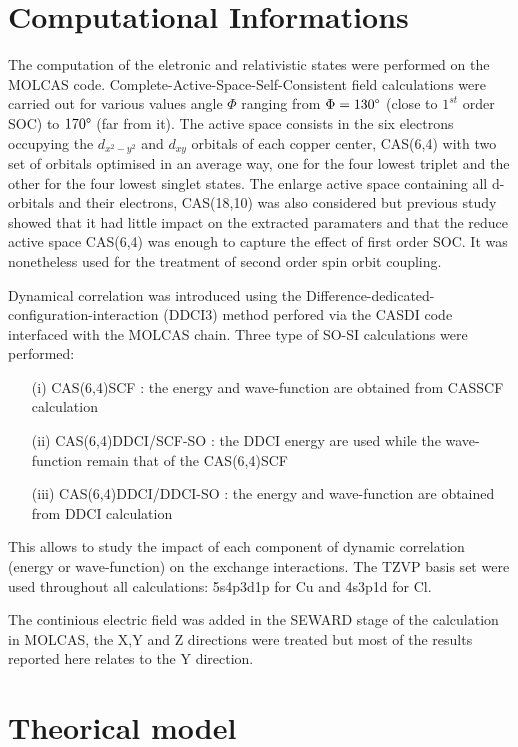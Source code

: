 \documentclass[10pt]{report}
\numberwithin{equation}{section}
\begin{document}
\section{Computational Informations}

The computation of the eletronic and relativistic states were performed on the MOLCAS code.
Complete-Active-Space-Self-Consistent field calculations were carried out for various values angle $\Phi$ ranging from $\Phi=130\degree$ (close to $1^{st}$ order SOC) to $170\degree$ (far from it).
The active space consists in the six electrons occupying the $d_{x^2-y^2}$ and $d_{xy}$ orbitals of each copper center, CAS(6,4) with two set of orbitals optimised in an average way, one for the four lowest triplet and the other for the four lowest singlet states.
The enlarge active space containing all d-orbitals and their electrons, CAS(18,10) was also considered but previous study showed that it had little impact on the extracted paramaters and that the reduce active space CAS(6,4) was enough to capture the effect of first order SOC.
It was nonetheless used for the treatment of second order spin orbit coupling.

Dynamical correlation was introduced using the Difference-dedicated-configuration-interaction (DDCI3) method perfored via the CASDI code interfaced with the MOLCAS chain.
Three type of SO-SI calculations were performed:
\begin{itemize}
    \item[(i)] CAS(6,4)SCF : the energy and wave-function are obtained from CASSCF calculation
    \item[(ii)] CAS(6,4)DDCI/SCF-SO : the DDCI energy are used while the wave-function remain that of the CAS(6,4)SCF
    \item[(iii)] CAS(6,4)DDCI/DDCI-SO : the energy and wave-function are obtained from DDCI calculation
\end{itemize}
This allows to study the impact of each component of dynamic correlation (energy or wave-function) on the exchange interactions.
The TZVP basis set were used throughout all calculations: 5s4p3d1p for Cu and 4s3p1d for Cl.

The continious electric field was added in the SEWARD stage of the calculation in MOLCAS, the X,Y and Z directions were treated but most of the results reported here relates to the Y direction.

\section{Theorical model}
\end{document}
